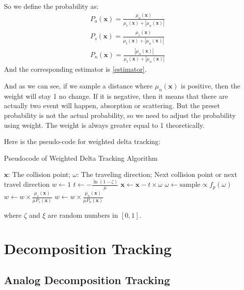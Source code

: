 \documentclass[acmtog]{acmart}
\begin{document}
So we define the probability as:
\begin{equation}
	\begin{aligned}
		P_a(\mathbf x)=\frac{\mu_a(\mathbf x)}{\mu_t(\mathbf x)+|\mu_n(\mathbf x)|}\\
		P_s(\mathbf x)=\frac{\mu_s(\mathbf x)}{\mu_t(\mathbf x)+|\mu_n(\mathbf x)|}\\
		P_n(\mathbf x)=\frac{|\mu_n(\mathbf x)|}{\mu_t(\mathbf x)+|\mu_n(\mathbf x)|}
	\end{aligned}
\end{equation}
And the corresponding estimator is \eqref{estimator}.

And as we can see, if we sample a distance where $\mu_n(\mathbf x)$ is positive,
then the weight will stay 1 no change.
If it is negative, then it means that there are actually two event will happen, absorption or scattering.
But the preset probability is not the actual probability, so we need to adjust the probability using weight.
The weight is always greater equal to 1 theoretically.

Here is the pseudo-code for weighted delta tracking:
\begin{algorithm}[H]
	\caption{Pseudocode of Weighted Delta Tracking Algorithm}
	\begin{algorithmic}[1]
		\Require
			$\mathbf x$: The collision point; $\omega$: The traveling direction;
		\Ensure
			Next collision point or next travel direction
			\State $w\gets1$
				\State $t\gets-\frac{\ln(1-\zeta)}{\bar\mu}$
				\State $\mathbf x\gets\mathbf x-t\times\omega$
					\State {}
					\State $\omega\gets\mathrm{sample}\propto f_p(\omega)$
					\State $w\gets w\times \frac{\mu_s(\mathbf x)}{\bar\mu P_s(\mathbf x)}$
				\Else {}
					\State $w\gets w\times \frac{\mu_n(\mathbf x)}{\bar\mu P_n(\mathbf x)}$
				\EndIf
			\EndWhile
	\end{algorithmic}
\end{algorithm}
where $\zeta$ and $\xi$ are random numbers in $[0,1]$.

\section{Decomposition Tracking}
\subsection{Analog Decomposition Tracking}
\end{document}
